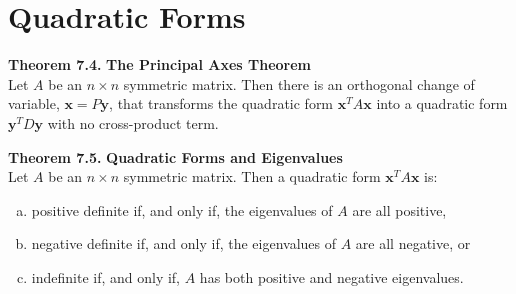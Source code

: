 \documentclass[10pt]{book}
\newenvironment{boxthm}{\begin{mdframed}[backgroundcolor=gray!30,nobreak=true]}{\end{mdframed}}
\newcommand{\vect}[1]{\ensuremath{\boldsymbol{\mathbf{#1}}}}
\DeclareMathOperator{\col}{col}
\DeclareMathOperator{\row}{row}
\begin{document}


\newpage


\section{Quadratic Forms}



\begin{boxthm}
	\textbf{Theorem 7.4.}
	\textbf{The Principal Axes Theorem} \\
	Let $A$ be an $n\times n$ symmetric matrix. Then there is an orthogonal change of variable, $\vect{x}=P\vect{y}$, that transforms the quadratic form $\vect{x}^TA\vect{x}$ into a quadratic form $\vect{y}^TD\vect{y}$ with no cross-product term.
\end{boxthm}
\begin{boxthm}
	\textbf{Theorem 7.5.}
	\textbf{Quadratic Forms and Eigenvalues} \\
	Let $A$ be an $n\times n$ symmetric matrix. Then a quadratic form $\vect{x}^TA\vect{x}$ is:
	\begin{enumerate}[(a)]\itemsep=0em
		\item positive definite if, and only if, the eigenvalues of $A$ are all positive,
		\item negative definite if, and only if, the eigenvalues of $A$ are all negative, or
		\item indefinite if, and only if, $A$ has both positive and negative eigenvalues.
	\end{enumerate}
\end{boxthm}
\end{document}
